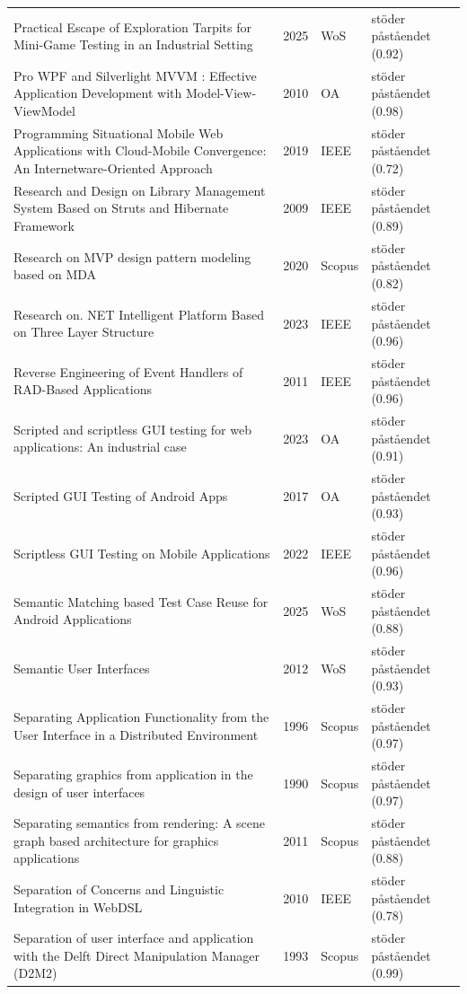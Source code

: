 \begin{longtable}{@{}%
  >{\raggedright\arraybackslash}p{}c%
  >{\raggedright\arraybackslash}p{}%
  >{\raggedright\arraybackslash}p{}@{}}
Practical Escape of Exploration Tarpits for Mini-Game Testing in an Industrial Setting & 2025 & WoS & stöder påståendet (0.92) \\
Pro WPF and Silverlight MVVM : Effective Application Development with Model-View-ViewModel & 2010 & OA & stöder påståendet (0.98) \\
Programming Situational Mobile Web Applications with Cloud-Mobile Convergence: An Internetware-Oriented Approach & 2019 & IEEE & stöder påståendet (0.72) \\
Research and Design on Library Management System Based on Struts and Hibernate Framework & 2009 & IEEE & stöder påståendet (0.89) \\
Research on MVP design pattern modeling based on MDA & 2020 & Scopus & stöder påståendet (0.82) \\
Research on. NET Intelligent Platform Based on Three Layer Structure & 2023 & IEEE & stöder påståendet (0.96) \\
Reverse Engineering of Event Handlers of RAD-Based Applications & 2011 & IEEE & stöder påståendet (0.96) \\
Scripted and scriptless GUI testing for web applications: An industrial case & 2023 & OA & stöder påståendet (0.91) \\
Scripted GUI Testing of Android Apps & 2017 & OA & stöder påståendet (0.93) \\
Scriptless GUI Testing on Mobile Applications & 2022 & IEEE & stöder påståendet (0.96) \\
Semantic Matching based Test Case Reuse for Android Applications & 2025 & WoS & stöder påståendet (0.88) \\
Semantic User Interfaces & 2012 & WoS & stöder påståendet (0.93) \\
Separating Application Functionality from the User Interface in a Distributed Environment & 1996 & Scopus & stöder påståendet (0.97) \\
Separating graphics from application in the design of user interfaces & 1990 & Scopus & stöder påståendet (0.97) \\
Separating semantics from rendering: A scene graph based architecture for graphics applications & 2011 & Scopus & stöder påståendet (0.88) \\
Separation of Concerns and Linguistic Integration in WebDSL & 2010 & IEEE & stöder påståendet (0.78) \\
Separation of user interface and application with the Delft Direct Manipulation Manager (D2M2) & 1993 & Scopus & stöder påståendet (0.99) \\

\end{longtable}
